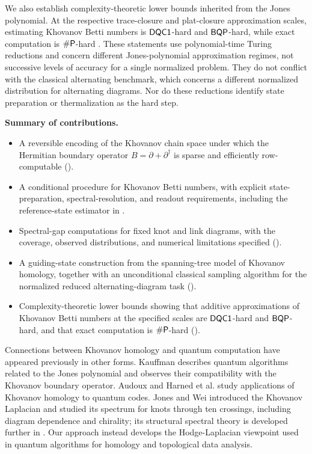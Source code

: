 \documentclass[a4paper,onecolumn,unpublished]{quantumarticle}
\theoremstyle{plain}
\theoremstyle{definition}
\theoremstyle{definition}
\numberwithin{equation}{section}
\begin{document}
We also establish complexity-theoretic lower bounds inherited from the Jones polynomial.  At the respective trace-closure and plat-closure approximation scales, estimating Khovanov Betti numbers is \(\mathsf{DQC1}\)-hard and \(\mathsf{BQP}\)-hard, while exact computation is \(\#\mathsf{P}\)-hard \cite{shor2007estimating,aharonov2011bqp,kuperberg2015hard,Aharonov-Jones-Landau}.  These statements use polynomial-time Turing reductions and concern different Jones-polynomial approximation regimes, not successive levels of accuracy for a single normalized problem.  They do not conflict with the classical alternating benchmark, which concerns a different normalized distribution for alternating diagrams.  Nor do these reductions identify state preparation or thermalization as the hard step.
\bigskip

\noindent \textbf{Summary of contributions.}
\begin{itemize}
\item A reversible encoding of the Khovanov chain space under which the Hermitian boundary operator $B=\partial+\partial^\dagger$ is sparse and efficiently row-computable ().
\item A conditional procedure for Khovanov Betti numbers, with explicit state-preparation, spectral-resolution, and readout requirements, including the reference-state estimator in .
\item Spectral-gap computations for fixed knot and link diagrams, with the coverage, observed distributions, and numerical limitations specified ().
\item A guiding-state construction from the spanning-tree model of Khovanov homology, together with an unconditional classical sampling algorithm for the normalized reduced alternating-diagram task ().
\item Complexity-theoretic lower bounds showing that additive approximations of Khovanov Betti numbers at the specified scales are $\mathsf{DQC1}$-hard and $\mathsf{BQP}$-hard, and that exact computation is $\#\mathsf{P}$-hard ().
\end{itemize}
\smallskip 

Connections between Khovanov homology and quantum computation have appeared previously in other forms.  Kauffman \cite{Kauffman_2011} describes quantum algorithms related to the Jones polynomial and observes their compatibility with the Khovanov boundary operator.  Audoux \cite{audoux2014application} and Harned et al. \cite{harned2024khovanov} study applications of Khovanov homology to quantum codes.  Jones and Wei \cite{JonesWei2025} introduced the Khovanov Laplacian and studied its spectrum for knots through ten crossings, including diagram dependence and chirality; its structural spectral theory is developed further in \cite{GrljLaudaSpectralGeometry}. Our approach instead develops the Hodge-Laplacian viewpoint used in quantum algorithms for homology and topological data analysis.
\end{document}
